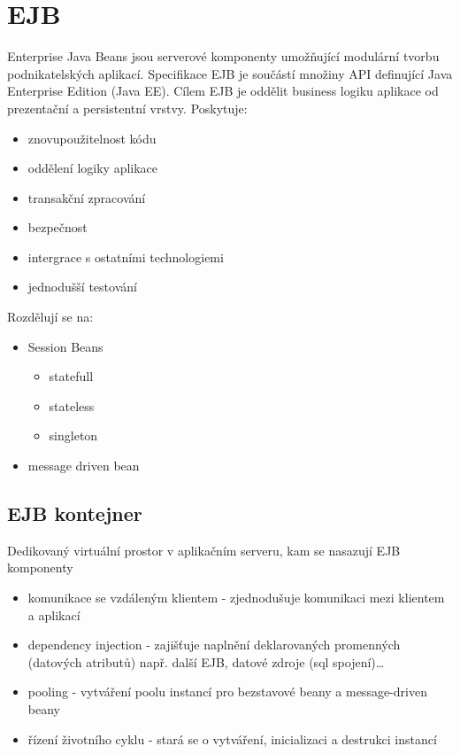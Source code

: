 \documentclass{szzclass}
\begin{document}
\tableofcontents
\newpage

\section{EJB}
Enterprise Java Beans jsou serverové komponenty umožňující modulární tvorbu podnikatelských aplikací.
\newline
Specifikace EJB je součástí množiny API definující Java Enterprise Edition (Java EE).
\newline
Cílem EJB je oddělit business logiku aplikace od prezentační a persistentní vrstvy. Poskytuje:
\begin{itemize}
    \item znovupoužitelnost kódu
    \item oddělení logiky aplikace
    \item transakční zpracování
    \item bezpečnost
    \item intergrace s ostatními technologiemi
    \item jednodušší testování
\end{itemize}
Rozdělují se na:
\begin{itemize}
    \item Session Beans
    \begin{itemize}
        \item statefull
        \item stateless
        \item singleton
    \end{itemize}
    \item message driven bean
\end{itemize}
\subsection{EJB kontejner}
Dedikovaný virtuální prostor v aplikačním serveru, kam se nasazují EJB komponenty
\begin{itemize}
    \item komunikace se vzdáleným klientem - zjednodušuje komunikaci mezi klientem a aplikací
    \item dependency injection - zajišťuje naplnění deklarovaných promenných (datových atributů) např. další EJB, datové zdroje (sql spojení)\dots
    \item pooling - vytváření poolu instancí pro bezstavové beany a message-driven beany
    \item řízení životního cyklu - stará se o vytváření, inicializaci a destrukci instancí
\end{itemize}
\end{document}
